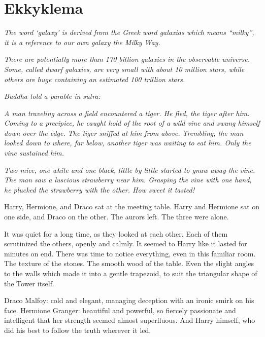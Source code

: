 \hypertarget{ekkyklema}{%
\chapter{Ekkyklema}\label{ekkyklema}}

\emph{The word `galaxy' is derived from the Greek word galaxias which
means ``milky'', it is a reference to our own galaxy the Milky Way.}

\emph{There are potentially more than 170 billion galaxies in the
observable universe. Some, called dwarf galaxies, are very small with
about 10 million stars, while others are huge containing an estimated
100 trillion stars.}


\mybreak

\emph{Buddha told a parable in sutra:}

\emph{A man traveling across a field encountered a tiger. He fled, the
tiger after him. Coming to a precipice, he caught hold of the root of a
wild vine and swung himself down over the edge. The tiger sniffed at him
from above. Trembling, the man looked down to where, far below, another
tiger was waiting to eat him. Only the vine sustained him.}

\emph{Two mice, one white and one black, little by little started to
gnaw away the vine. The man saw a luscious strawberry near him. Grasping
the vine with one hand, he plucked the strawberry with the other. How
sweet it tasted!}

\mybreak

Harry, Hermione, and Draco sat at the meeting table. Harry and Hermione
sat on one side, and Draco on the other. The aurors left. The three were
alone.

It was quiet for a long time, as they looked at each other. Each of them
scrutinized the others, openly and calmly. It seemed to Harry like it
lasted for minutes on end. There was time to notice everything, even in
this familiar room. The texture of the stones. The smooth wood of the
table. Even the slight angles to the walls which made it into a gentle
trapezoid, to suit the triangular shape of the Tower itself.

Draco Malfoy: cold and elegant, managing deception with an ironic smirk
on his face. Hermione Granger: beautiful and powerful, so fiercely
passionate and intelligent that her strength seemed almost superfluous.
And Harry himself, who did his best to follow the truth wherever it led.

